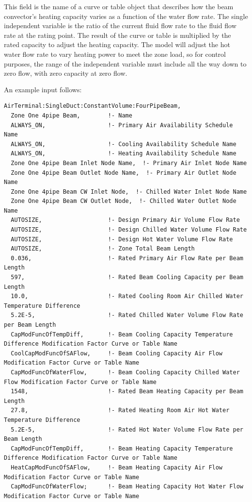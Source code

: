 This field is the name of a curve or table object that describes how the beam convector's heating capacity varies as a function of the water flow rate. The single independent variable is the ratio of the current fluid flow rate to the fluid flow rate at the rating point. The result of the curve or table is multiplied by the rated capacity to adjust the heating capacity. The model will adjust the hot water flow rate to vary heating power to meet the zone load, so for control purposes, the range of the independent variable must include all the way down to zero flow, with zero capacity at zero flow.

An example input follows:

\begin{lstlisting}
AirTerminal:SingleDuct:ConstantVolume:FourPipeBeam,
  Zone One 4pipe Beam,        !- Name
  ALWAYS_ON,                  !- Primary Air Availability Schedule Name
  ALWAYS_ON,                  !- Cooling Availability Schedule Name
  ALWAYS_ON,                  !- Heating Availability Schedule Name
  Zone One 4pipe Beam Inlet Node Name,  !- Primary Air Inlet Node Name
  Zone One 4pipe Beam Outlet Node Name,  !- Primary Air Outlet Node Name
  Zone One 4pipe Beam CW Inlet Node,  !- Chilled Water Inlet Node Name
  Zone One 4pipe Beam CW Outlet Node,  !- Chilled Water Outlet Node Name
  AUTOSIZE,                   !- Design Primary Air Volume Flow Rate
  AUTOSIZE,                   !- Design Chilled Water Volume Flow Rate
  AUTOSIZE,                   !- Design Hot Water Volume Flow Rate
  AUTOSIZE,                   !- Zone Total Beam Length
  0.036,                      !- Rated Primary Air Flow Rate per Beam Length
  597,                        !- Rated Beam Cooling Capacity per Beam Length
  10.0,                       !- Rated Cooling Room Air Chilled Water Temperature Difference
  5.2E-5,                     !- Rated Chilled Water Volume Flow Rate per Beam Length
  CapModFuncOfTempDiff,       !- Beam Cooling Capacity Temperature Difference Modification Factor Curve or Table Name
  CoolCapModFuncOfSAFlow,     !- Beam Cooling Capacity Air Flow Modification Factor Curve or Table Name
  CapModFuncOfWaterFlow,      !- Beam Cooling Capacity Chilled Water Flow Modification Factor Curve or Table Name
  1548,                       !- Rated Beam Heating Capacity per Beam Length
  27.8,                       !- Rated Heating Room Air Hot Water Temperature Difference
  5.2E-5,                     !- Rated Hot Water Volume Flow Rate per Beam Length
  CapModFuncOfTempDiff,       !- Beam Heating Capacity Temperature Difference Modification Factor Curve or Table Name
  HeatCapModFuncOfSAFlow,     !- Beam Heating Capacity Air Flow Modification Factor Curve or Table Name
  CapModFuncOfWaterFlow;      !- Beam Heating Capacity Hot Water Flow Modification Factor Curve or Table Name
\end{lstlisting}

